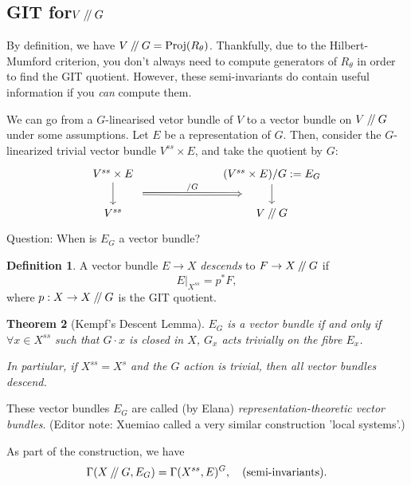 \documentclass{article}
\newtheorem{theorem}{Theorem}
\theoremstyle{definition}
\newtheorem{definition}[theorem]{Definition}
\theoremstyle{remark}
\numberwithin{theorem}{section}
\newcommand{\sslash}{\mathbin{/\mkern-4mu/}}
\newcommand{\Proj}{\text{Proj}}
\newenvironment{defn}{
	\begin{mdframed}
		\vspace{-0.5em}
		\begin{definition}
		}{
		\end{definition}
	\end{mdframed}
}
\begin{document}
			\subsection{GIT for$V\sslash G$}
			By definition, we have $V\sslash G = \Proj(R_\theta)$. Thankfully, due to the Hilbert-Mumford criterion, you don't always need to compute generators of $R_\theta$ in order to find the GIT quotient. However, these semi-invariants do contain useful information if you \emph{can} compute them. \vspace{1em}
			
			We can go from a $G$-linearised vetor bundle of $V$ to a vector bundle on $V\sslash G$ under some assumptions.  Let $E$ be a representation of $G$. Then, consider the $G$-linearized trivial vector bundle $V^{ss}\times E$, and take the quotient by $G$:
\[\begin{tikzcd}
	{V^{ss}\times E} &&& {(V^{ss}\times E)/G := E_G} \\
	{V^{ss}} &&& {V\sslash G}
	\arrow[""{name=0, anchor=center, inner sep=0}, from=1-1, to=2-1]
	\arrow[""{name=1, anchor=center, inner sep=0}, from=1-4, to=2-4]
	\arrow["{/G}", shorten <=26pt, shorten >=26pt, Rightarrow, from=0, to=1]
\end{tikzcd}\]
			Question: When is $E_G$ a vector bundle?
			\begin{defn}
				A vector bundle $E\to X$ \emph{descends} to $F\to X\sslash G$ if
				\begin{equation}
					E|_{X^{ss}} = p^\ast F,
				\end{equation}
				where $p:X\to X\sslash G$ is the GIT quotient.
			\end{defn}
			\begin{theorem}[Kempf's Descent Lemma]
				$E_G$ is a vector bundle if and only if $\forall x\in X^{ss}$ such that $G\cdot x$ is closed in $X$, $G_x$ acts trivially on the fibre $E_x$. \vspace{1em}
				
				In partiular, if $X^{ss}=X^{s}$ and the $G$ action is trivial, then all vector bundles descend.
			\end{theorem}
			These vector bundles $E_G$ are called (by Elana) \emph{representation-theoretic vector bundles}. (Editor note: Xuemiao called a very similar construction  'local systems'.) \vspace{1em}
			
			As part of the construction, we have
			\begin{equation}
				\Gamma(X\sslash G, E_G) = \Gamma(X^{ss}, E)^G, \quad \text{(semi-invariants)}.
			\end{equation}
			
\end{document}
